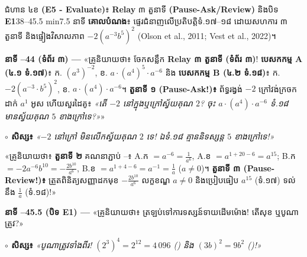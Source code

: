 \documentclass[a4paper,12pt]{article}
\newcommand{\en}[1]{{\TimesEn #1}}
\newcommand{\enbf}[1]{{\TimesEn\textbf{#1}}}
\newcommand{\cnum}[1]{{\TimesEn\fontsize{10.5pt}{12pt}\selectfont\ding{\numexpr181+#1\relax}}}
\newcommand{\teachersays}[1]{{\muol\fontsize{10.8pt}{17pt}\selectfont «គ្រូនិយាយថា៖} #1»}
\begin{document}
\Needspace{2.0cm}
\begin{phasebox}{ជំហាន ៤ខ \enbf{(E5 - Evaluate)}៖ \enbf{Relay} ៣ តួនាទី \enbf{(Pause-Ask/Review)} និងបិទ \enbf{E1}}{38--45.5 min}{7.5 នាទី}
\textbf{គោលបំណង}៖ ផ្ទេរជំនាញលើប្រតិបត្តិទំ.១៧--១៨ ដោយសហការ ៣ តួនាទី និងផ្ទៀងវិសាលភាព $-2(a^{-3}b^5)^2$ \en{(Olson et al., 2011; Vest et al., 2022)}។
\end{phasebox}
\begin{scriptbox}
  \textbf{នាទី \en{38--44} (ទំព័រ ៣) — }\teachersays{ចែកសន្លឹក \textbf{Relay ៣ តួនាទី (ទំព័រ ៣)}! \textbf{បេសកកម្ម A (៤.១ ទំ.១៧)}៖ ក. $(a^3)^{-2}$, ខ. $a\cdot(a^4)^5\cdot a^{-6}$ និង \textbf{បេសកកម្ម B (៤.២ ទំ.១៨)}៖ ក. $-2(a^{-3}\cdot b^5)^2$, ខ. $a\cdot(a^4)\cdot a^{-6}$។ \textbf{តួនាទី ១ (\en{Pause-Ask!})៖} ព័ទ្ធរង្វង់ $-2$ ក្រៅវង់ក្រចក ដាក់ $a^1$ អូស \en{[tracing]} ហើយសួរដៃគូ៖ \textit{«តើ $-2$ នៅក្នុងឬក្រៅស្វ័យគុណ $2$? ចុះ $a\cdot(a^4)\cdot a^{-6}$ ទំ.១៨ មានស្វ័យគុណ $5$ ខាងក្រៅទេ?»}}\par\vspace{2pt}
  \textbf{$\circ$ សិស្ស៖} \textit{«$-2$ នៅក្រៅ មិនលើកស្វ័យគុណ $2$ ទេ! ឯទំ.១៨ គ្មាននិទស្សន្ត $5$ ខាងក្រៅទេ!»}\par\vspace{3pt}
  \teachersays{\textbf{តួនាទី ២} គណនាភ្ជាប់ \cnum{1}--\cnum{5}៖ A.ក $=a^{-6}=\frac{1}{a^6}$, A.ខ $=a^{1+20-6}=a^{15}$; B.ក $=-2a^{-6}b^{10}=-\frac{2b^{10}}{a^6}$, B.ខ $=a^{1+4-6}=a^{-1}=\frac{1}{a}$ ($a\neq 0$)។ \textbf{តួនាទី ៣ (\en{Pause-Review!})៖} ត្រួតពិនិត្យសញ្ញាដកមុខ $-\frac{2b^{10}}{a^6}$ លក្ខខណ្ឌ $a\neq 0$ និងប្រៀបធៀប $a^{15}$ (ទំ.១៧) ទល់នឹង $\frac{1}{a}$ (ទំ.១៨)!}\par\vspace{3pt}
  \textbf{នាទី \en{44--45.5} (បិទ \en{E1}) — }\teachersays{ត្រឡប់ទៅការទស្សន៍ទាយដើមម៉ោង! តើសុខ ឬបូណាត្រូវ?}\par\vspace{2pt}
  \textbf{$\circ$ សិស្ស៖} \textit{«បូណាត្រូវទាំងពីរ! $(2^3)^4 = 2^{12} = 4\,096$ (\cnum{1}) និង $(3b)^2 = 9b^2$ (\cnum{2})!»}
\end{scriptbox}
\end{document}
